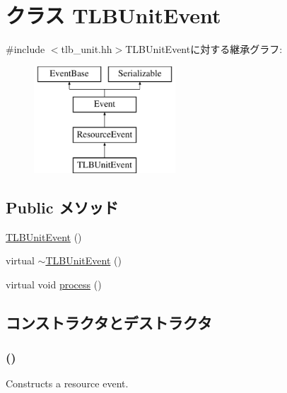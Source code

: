 \hypertarget{classTLBUnitEvent}{
\section{クラス TLBUnitEvent}
\label{classTLBUnitEvent}
}


{\ttfamily \#include $<$tlb\_\-unit.hh$>$}TLBUnitEventに対する継承グラフ:\begin{figure}[H]
\begin{center}
\leavevmode
\includegraphics[height=4cm]{classTLBUnitEvent}
\end{center}
\end{figure}
\subsection*{Public メソッド}
\begin{DoxyCompactItemize}
\item 
\hyperlink{classTLBUnitEvent_a2ae6a773d3055b108313b6ae273aa8ce}{TLBUnitEvent} ()
\item 
virtual \hyperlink{classTLBUnitEvent_aa511a582129d05f3f4a40993c209a237}{$\sim$TLBUnitEvent} ()
\item 
virtual void \hyperlink{classTLBUnitEvent_a2e9c5136d19b1a95fc427e0852deab5c}{process} ()
\end{DoxyCompactItemize}


\subsection{コンストラクタとデストラクタ}
\hypertarget{classTLBUnitEvent_a2ae6a773d3055b108313b6ae273aa8ce}{
\subsubsection[{TLBUnitEvent}]{ ()}}
\label{classTLBUnitEvent_a2ae6a773d3055b108313b6ae273aa8ce}
Constructs a resource event. 


